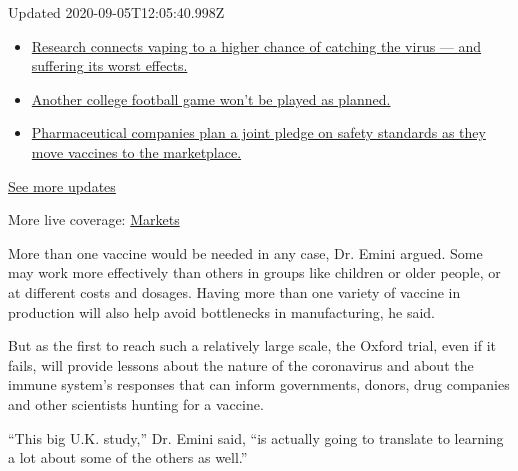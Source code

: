 Updated 2020-09-05T12:05:40.998Z

\begin{itemize}
\tightlist
\item
  \href{https://www.nytimes3xbfgragh.onion/2020/09/04/world/covid-19-coronavirus.html?action=click\&pgtype=Article\&state=default\&region=MAIN_CONTENT_1\&context=storylines_live_updates\#link-1654f6ad}{Research
  connects vaping to a higher chance of catching the virus --- and
  suffering its worst effects.}
\item
  \href{https://www.nytimes3xbfgragh.onion/2020/09/04/world/covid-19-coronavirus.html?action=click\&pgtype=Article\&state=default\&region=MAIN_CONTENT_1\&context=storylines_live_updates\#link-52e4198a}{Another
  college football game won't be played as planned.}
\item
  \href{https://www.nytimes3xbfgragh.onion/2020/09/04/world/covid-19-coronavirus.html?action=click\&pgtype=Article\&state=default\&region=MAIN_CONTENT_1\&context=storylines_live_updates\#link-181cef0}{Pharmaceutical
  companies plan a joint pledge on safety standards as they move
  vaccines to the marketplace.}
\end{itemize}

\href{https://www.nytimes3xbfgragh.onion/2020/09/04/world/covid-19-coronavirus.html?action=click\&pgtype=Article\&state=default\&region=MAIN_CONTENT_1\&context=storylines_live_updates}{See
more updates}

More live coverage:
\href{https://www.nytimes3xbfgragh.onion/live/2020/09/04/business/stock-market-today-coronavirus?action=click\&pgtype=Article\&state=default\&region=MAIN_CONTENT_1\&context=storylines_live_updates}{Markets}

More than one vaccine would be needed in any case, Dr. Emini argued.
Some may work more effectively than others in groups like children or
older people, or at different costs and dosages. Having more than one
variety of vaccine in production will also help avoid bottlenecks in
manufacturing, he said.

But as the first to reach such a relatively large scale, the Oxford
trial, even if it fails, will provide lessons about the nature of the
coronavirus and about the immune system's responses that can inform
governments, donors, drug companies and other scientists hunting for a
vaccine.

``This big U.K. study,'' Dr. Emini said, ``is actually going to
translate to learning a lot about some of the others as well.''

